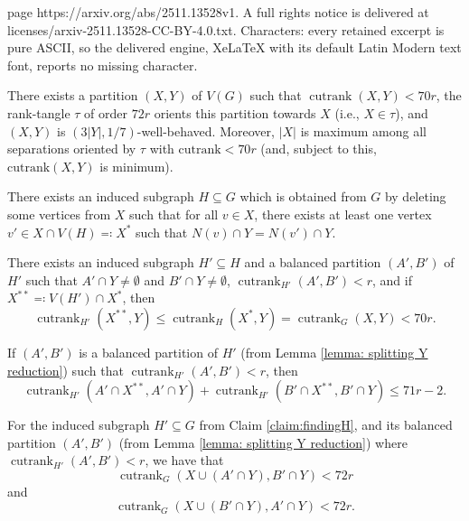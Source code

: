 \documentclass[10pt,a4paper]{amsart}
\begin{document}
page https://arxiv.org/abs/2511.13528v1. A full rights notice is delivered at licenses/arxiv-2511.13528-CC-BY-4.0.txt. Characters: every retained excerpt is pure ASCII, so the delivered engine, XeLaTeX with its default Latin Modern text font, reports no missing character.
\begin{claim}
\label{claim:rank-tangle existence}
    There exists a partition $(X,Y)$ of $V(G)$ such that $\operatorname{cutrank}(X,Y) < 70r$, the rank-tangle $\tau$ of order $72r$ orients this partition towards $X$ (i.e., $X \in \tau$), and $(X,Y)$ is $(3|Y|, 1/7)$-well-behaved. Moreover, $|X|$ is maximum among all separations oriented by $\tau$ with $\mathrm{cutrank}<70r$ (and, subject to this, $\mathrm{cutrank}(X,Y)$ is minimum).
\end{claim}

\begin{claim}
\label{claim:findingH}
    There exists an induced subgraph $H\subseteq G$ which is obtained from $G$ by deleting some vertices from $X$ such that for  all $v\in X$, there exists at least one vertex $v'\in X\cap V(H) \eqqcolon X^*$ such that $N(v)\cap Y = N(v')\cap Y$.
\end{claim}

\begin{lemma}[Splitting $Y$]
    \label{lemma: splitting Y reduction}
    There exists an induced subgraph $H'\subseteq H$ and a balanced partition $(A', B')$ of $H'$ such that $A' \cap Y \neq \emptyset$ and $B'\cap Y\neq\emptyset$, $\operatorname{cutrank}_{H'}(A', B') < r$, and if $X^{**} \eqqcolon V(H') \cap X^*$, then \[\operatorname{cutrank}_{H'}(X^{**}, Y) \leq \operatorname{cutrank}_H(X^*, Y) = \operatorname{cutrank}_G(X,Y) < 70r.\]
\end{lemma}

\begin{lemma}\label{lemma: second_condition}
If $(A',B')$ is a balanced partition of $H'$ (from Lemma \ref{lemma: splitting Y reduction}) such that $\operatorname{cutrank}_{H'}(A',B') < r$, then \[\operatorname{cutrank}_{H'}(A' \cap X^{**}, A' \cap Y) + \operatorname{cutrank}_{H'}(B'\cap X^{**}, B' \cap Y) \leq 71r - 2.\]
\end{lemma}

\begin{lemma} \label{lemma:cutrank<r implies cutrank<70r}
    For the induced subgraph $H' \subseteq G$ from Claim \ref{claim:findingH}, and its balanced partition $(A',B')$ (from Lemma \ref{lemma: splitting Y reduction}) where $\operatorname{cutrank}_{H'}(A',B')<r$, we have that 
    \[\operatorname{cutrank}_G(X\cup (A' \cap  Y), B' \cap  Y) < 72r\] and \[\operatorname{cutrank}_G(X\cup (B' \cap Y), A' \cap Y) < 72r.\]
\end{lemma}
\end{document}
